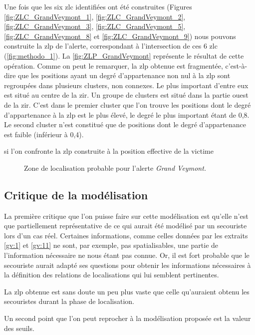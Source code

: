Une fois que les six \ac{zlc} identifiées ont été construites (Figures
\ref{fig:ZLC_GrandVeymont_1}, \ref{fig:ZLC_GrandVeymont_2},
\ref{fig:ZLC_GrandVeymont_3}, \ref{fig:ZLC_GrandVeymont_5},
\ref{fig:ZLC_GrandVeymont_8} et \ref{fig:ZLC_GrandVeymont_9}) nous
pouvons construite la \ac{zlp} de l'alerte, correspondant à
l'intersection de ces 6 \ac{zlc} (\autoref{fig:methodo_1}). La
\autoref{fig:ZLP_GrandVeymont} représente le résultat de cette
opération. Comme on peut le remarquer, la \ac{zlp} obtenue est
fragmentée, c'est-à-dire que les positions ayant un degré
d'appartenance non nul à la \ac{zlp} sont regroupées dans plusieurs
clusters, non connexes. Le plus important d'entre eux est situé au
centre de la \ac{zir}. Un groupe de clusters est situé dans la partie
ouest de la \ac{zir}. C'est dans le premier cluster que l'on trouve
les positions dont le degré d'appartenance à la \ac{zlp} est le plus
élevé, le degré le plus important étant de 0,8. Le second cluster
n'est constitué que de positions dont le degré d'appartenance est
faible (inférieur à 0,4). 

si l'on confronte la \ac{zlp} construite à la position effective de la
victime 


\begin{figure}
  \centering
  
  \caption{Zone de localisation probable pour l'alerte \emph{Grand
      Veymont.}}
  \label{fig:ZLP_GrandVeymont}
\end{figure}


\subsection{Critique de la modélisation}
\label{subsec:9-2-3}


La première critique que l'on puisse faire sur cette modélisation est
qu'elle n'est que partiellement représentative de ce qui aurait été
modélisé par un secouriste lors d'un cas réel. Certaines informations,
comme celles données par les extraits \ref{gv:1} et \ref{gv:11} ne
sont, par exemple, pas spatialisables, une partie de l'information
nécessaire ne nous étant pas connue. Or, il est fort probable que le
secouriste aurait adapté ses questions pour obtenir les informations
nécessaires à la définition des relations de localisations qui lui
semblent pertinentes.

La \ac{zlp} obtenue est sans doute un peu plus vaste que celle
qu'auraient obtenu les secouristes durant la phase de localisation.

Un second point que l'on peut reprocher à la modélisation proposée est
la valeur des seuils.


